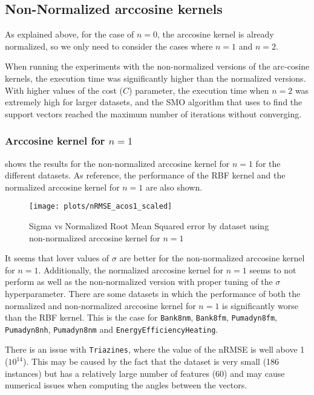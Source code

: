\subsection{Non-Normalized arccosine kernels}

As explained above, for the case of $n=0$, the arccosine kernel is already
normalized, so we only need to consider the cases where $n=1$ and $n=2$.

When running the experiments with the non-normalized versions of the arc-cosine
kernels, the execution time was significantly higher than the normalized versions.
With higher values of the cost ($C$) parameter, the execution time when $n=2$ was
extremely high for larger datasets, and the SMO algorithm that \libsvm uses to find
the support vectors reached the maximum number of iterations without converging.

\subsubsection{Arccosine kernel for $n=1$}

 shows the results for the non-normalized arccosine
kernel for $n=1$ for the different datasets. As reference, the performance of
the RBF kernel and the normalized arccosine kernel for $n=1$ are also shown.

\begin{figure}[H]
    \texttt{[image: plots/nRMSE\_acos1\_scaled]}
    \caption{Sigma vs Normalized Root Mean Squared error by dataset using non-normalized arccosine kernel for $n=1$}%
    \label{fig:nrmse-acos1-scaled}
\end{figure}

It seems that lover values of $\sigma$ are better for the non-normalized arccosine
kernel for $n=1$. Additionally, the normalized arccosine kernel for $n=1$ seems
to not perform as well as the non-normalized version with proper tuning of the
$\sigma$ hyperparameter. There are some datasets in which the performance of
both the normalized and non-normalized arccosine kernel for $n=1$ is significantly
worse than the RBF kernel. This is the case for \texttt{Bank8nm}, \texttt{Bank8fm},
\texttt{Pumadyn8fm}, \texttt{Pumadyn8nh}, \texttt{Pumadyn8nm} and \texttt{EnergyEfficiencyHeating}.

There is an issue with \texttt{Triazines}, where the value of the nRMSE is well
above 1 ($10^{14}$). This may be caused by the fact that the dataset is very small
(186 instances) but has a relatively large number of features (60) and may cause numerical
issues when computing the angles between the vectors.

